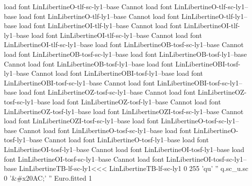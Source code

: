 load font	LinLibertineO-tlf-sc-ly1--base
Cannot load font LinLibertineO-tlf-sc-ly1--base
load font	LinLibertineO-tlf-ly1--base
Cannot load font LinLibertineO-tlf-ly1--base
load font	LinLibertineOI-tlf-ly1--base
Cannot load font LinLibertineOI-tlf-ly1--base
load font	LinLibertineOI-tlf-sc-ly1--base
Cannot load font LinLibertineOI-tlf-sc-ly1--base
load font	LinLibertineOB-tosf-sc-ly1--base
Cannot load font LinLibertineOB-tosf-sc-ly1--base
load font	LinLibertineOB-tosf-ly1--base
Cannot load font LinLibertineOB-tosf-ly1--base
load font	LinLibertineOBI-tosf-ly1--base
Cannot load font LinLibertineOBI-tosf-ly1--base
load font	LinLibertineOBI-tosf-sc-ly1--base
Cannot load font LinLibertineOBI-tosf-sc-ly1--base
load font	LinLibertineOZ-tosf-sc-ly1--base
Cannot load font LinLibertineOZ-tosf-sc-ly1--base
load font	LinLibertineOZ-tosf-ly1--base
Cannot load font LinLibertineOZ-tosf-ly1--base
load font	LinLibertineOZI-tosf-sc-ly1--base
Cannot load font LinLibertineOZI-tosf-sc-ly1--base
load font	LinLibertineO-tosf-sc-ly1--base
Cannot load font LinLibertineO-tosf-sc-ly1--base
load font	LinLibertineO-tosf-ly1--base
Cannot load font LinLibertineO-tosf-ly1--base
load font	LinLibertineOI-tosf-ly1--base
Cannot load font LinLibertineOI-tosf-ly1--base
load font	LinLibertineOI-tosf-sc-ly1--base
Cannot load font LinLibertineOI-tosf-sc-ly1--base
\<LinLibertineTB-lf-sc-ly1\><<<
LinLibertineTB-lf-sc-ly1 0 255
'qu' '' q.sc_u.sc 0
'&#x20AC;' '' Euro.fitted 1
